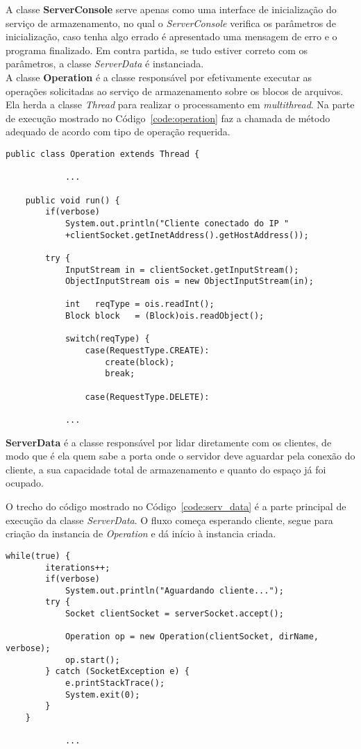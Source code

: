 A classe \textbf{ServerConsole} serve apenas como uma interface de inicialização do serviço de armazenamento, no qual o \textit{ServerConsole} verifica os parâmetros de inicialização, caso tenha algo errado é apresentado uma mensagem de erro e o programa finalizado. Em contra partida, se tudo estiver correto com os parâmetros, a classe \textit{ServerData} é instanciada.
\\

A classe \textbf{Operation} é a classe responsável por efetivamente executar as operações solicitadas ao serviço de armazenamento sobre os blocos de arquivos.
Ela herda a classe \textit{Thread} para realizar o processamento em \textit{multithread}.
Na parte de execução mostrado no Código~\ref{code:operation} faz a chamada de método adequado de acordo com tipo de operação requerida.
\begin{lstlisting}[basicstyle=\ttfamily\footnotesize, frame=single, caption=Declaração e o método de execução da classe Operation, label=code:operation]		
public class Operation extends Thread {
	
			...
			
	public void run() {
		if(verbose)
			System.out.println("Cliente conectado do IP "
			+clientSocket.getInetAddress().getHostAddress());
		
		try {
			InputStream in = clientSocket.getInputStream();
			ObjectInputStream ois = new ObjectInputStream(in);
			
			int   reqType = ois.readInt();
			Block block   = (Block)ois.readObject();
			
			switch(reqType) {
				case(RequestType.CREATE):
					create(block);
					break;
			
				case(RequestType.DELETE):
			
			...
\end{lstlisting}



\textbf{ServerData} é a classe responsável por lidar diretamente com os clientes, de modo que é ela quem sabe a porta onde o servidor deve aguardar pela conexão do cliente, a sua capacidade total de armazenamento e quanto do espaço já foi ocupado.

O trecho do código mostrado no Código~\ref{code:serv_data} é a parte principal de execução da classe \textit{ServerData}.
O fluxo começa esperando cliente,  segue para criação da instancia de \textit{Operation} e dá início à instancia criada.
\begin{lstlisting}[basicstyle=\ttfamily\footnotesize, frame=single, caption=Declaração e o método de execução da classe Operation, label=code:serv_data]		
	while(true) {
		iterations++;
		if(verbose)
			System.out.println("Aguardando cliente...");
		try {
			Socket clientSocket = serverSocket.accept();
			
			Operation op = new Operation(clientSocket, dirName, verbose);
			op.start();
		} catch (SocketException e) {
			e.printStackTrace();
			System.exit(0);
		}
	}
	
			...
\end{lstlisting}

